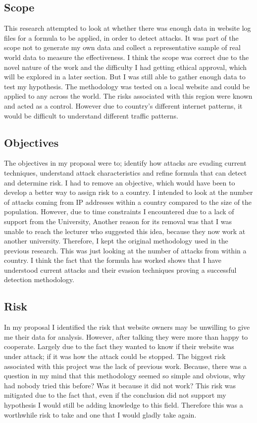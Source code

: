 \subsection{Scope}

This research attempted to look at whether there was enough data in website log files for a formula to be applied, in order to detect attacks. It was part of the scope not to generate my own data and collect a representative sample of real world data to measure the effectiveness. I think the scope was correct due to the novel nature of the work and the difficulty I had getting ethical approval, which will be explored in a later section. But I was still able to gather enough data to test my hypothesis. The methodology was tested on a local website and could be applied to any across the world. The risks associated with this region were known and acted as a control. However due to country's different internet patterns, it would be difficult to understand different traffic patterns. 


\subsection{Objectives}

The objectives in my proposal were to; identify how attacks are evading current techniques, understand attack characteristics and refine formula that can detect and determine risk. I had to remove an objective, which would have been to develop a better way to assign risk to a country. I intended to look at the number of attacks coming from IP addresses within a country compared to the size of the population. However, due to time constraints I encountered due to a lack of support from the University, Another reason for its removal was that I was unable to reach the lecturer who suggested this idea, because they now work at another university. Therefore, I kept the original methodology used in the previous research. This was just looking at the number of attacks from within a country. I think the fact that the formula has worked shows that I have understood current attacks and their evasion techniques proving a successful detection methodology.

\subsection{Risk}

In my proposal I identified the risk that website owners may be unwilling to give me their data for analysis. However, after talking they were more than happy to cooperate. Largely due to the fact they wanted to know if their website was under attack; if it was how the attack could be stopped. The biggest risk associated with this project was the lack of previous work. Because, there was a question in my mind that this methodology seemed so simple and obvious, why had nobody tried this before? Was it because it did not work? This risk was mitigated due to the fact that, even if the conclusion did not support my hypothesis I would still be adding knowledge to this field. Therefore this was a worthwhile risk to take and one that I would gladly take again.